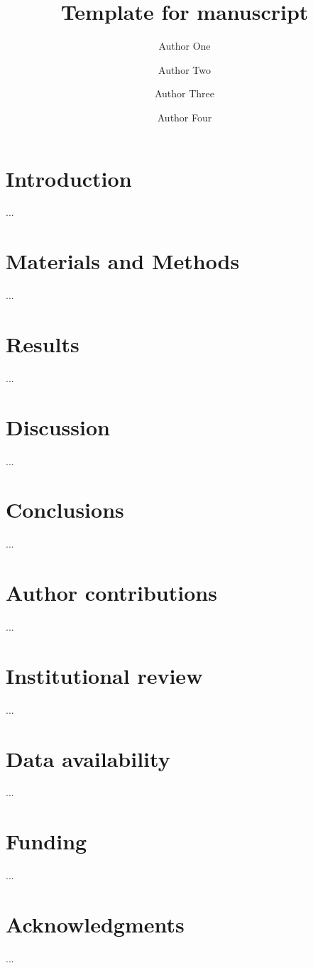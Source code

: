 \documentclass[fleqn,11pt,lineno]{manuscript}\usepackage[]{graphicx}\usepackage[]{xcolor}
\title{Template for manuscript}
\author[1]{Author One}
\author[1]{Author Two}
\author[2,3]{Author Three}
\author[1]{Author Four}
\affil[1]{Author one affiliation}
\affil[2]{Author two affiliation}
\affil[3]{Author three affiliation}
\begin{document}
\flushbottom
\maketitle
\thispagestyle{empty}

\section*{Introduction}
...

\section*{Materials and Methods}
...

\section*{Results}
...
 
\section*{Discussion}
...

\section*{Conclusions}
...

\section*{Author contributions}
...

\section*{Institutional review}
...

\section*{Data availability} 
...

\section*{Funding}
...

\section*{Acknowledgments}
...
\end{document}
